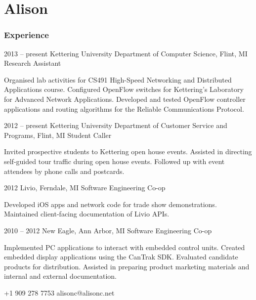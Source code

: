 \documentclass[12pt]{tccv/tccv}
\begin{document}
\part{Alison}

\section{Experience}

\begin{eventlist}
\item{2013 -- present}
     {Kettering University Department of Computer Science, Flint, MI}
     {Research Assistant}
     
     Organised lab activities for CS491 High-Speed Networking and 
     Distributed Applications course. Configured OpenFlow switches 
     for Kettering's Laboratory for Advanced Network Applications.
     Developed and tested OpenFlow controller applications and routing algorithms 
     for the Reliable Communications Protocol.

\item{2012 -- present}
     {Kettering University Department of Customer Service and Programs, Flint, MI}
     {Student Caller}
     
     Invited prospective students to Kettering open house events.
     Assisted in directing self-guided tour traffic during open house events.
     Followed up with event attendees by phone calls and postcards.
     
\item{2012}
     {Livio, Ferndale, MI}
     {Software Engineering Co-op}
     
     Developed iOS apps and network code for trade show demonstrations.
     Maintained client-facing documentation of Livio APIs.
     
\item{2010 -- 2012}
     {New Eagle, Ann Arbor, MI}
     {Software Engineering Co-op}
     
     Implemented PC applications to interact with embedded control units.
     Created embedded display applications using the CanTrak SDK.
     Evaluated candidate products for distribution.
     Assisted in preparing product marketing materials and internal and 
     external documentation.
     
\end{eventlist}

    {+1 909 278 7753}
    {alisonc@alisonc.net}
\end{document}
